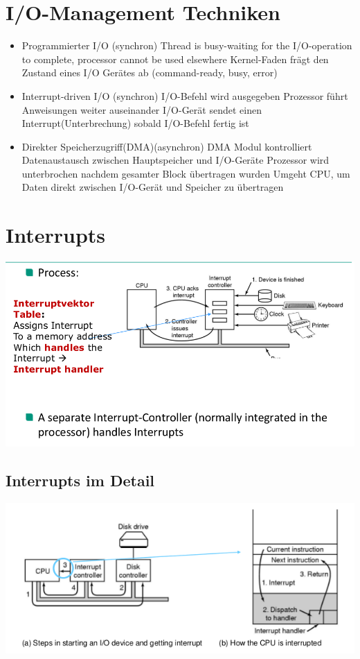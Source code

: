 \documentclass[a4paper]{scrreprt}
\begin{document}
\section{I/O-Management Techniken}
\begin{itemize}
	\item Programmierter I/O (synchron)
		\subitem Thread is busy-waiting for the I/O-operation to complete, processor
cannot be used elsewhere
		\subitem Kernel-Faden frägt den Zustand eines I/O Gerätes ab (command-ready, busy, error)
	\item Interrupt-driven I/O (synchron)
		\subitem I/O-Befehl wird ausgegeben
		\subitem Prozessor führt Anweisungen weiter auseinander
		\subitem I/O-Gerät sendet einen Interrupt(Unterbrechung) sobald I/O-Befehl fertig ist
	\item Direkter Speicherzugriff(DMA)(asynchron)
		\subitem DMA Modul kontrolliert Datenaustausch zwischen Hauptspeicher und I/O-Geräte	\subitem Prozessor wird unterbrochen nachdem gesamter Block übertragen wurden	
		\subitem Umgeht CPU, um Daten direkt zwischen I/O-Gerät und Speicher zu übertragen
\end{itemize}
\section{Interrupts}
\includegraphics[scale=0.7]{graphics/chapter9_4.png}
\subsection{Interrupts im Detail}
\includegraphics[scale=0.9]{graphics/chapter9_5.png}
\end{document}
